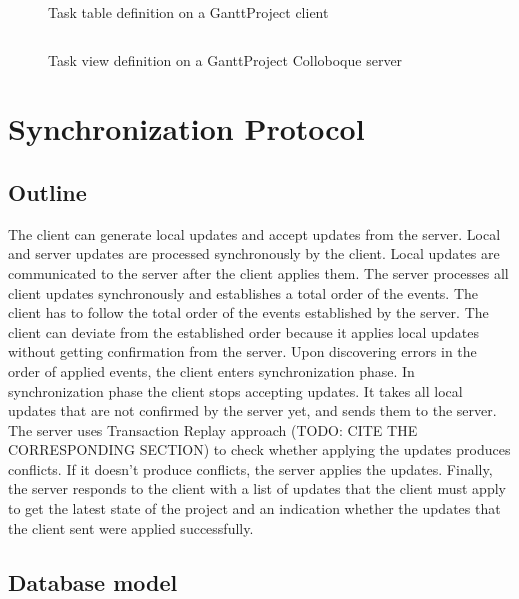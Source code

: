\documentclass[a4paper, 11pt, oneside]{article}
\theoremstyle{definition}
\begin{document}
\begin{figure}
    \inputminted[frame=single,linenos]{sql}{lst/client-database-init.sql}
    \caption{Task table definition on a GanttProject client}
    \label{fig:client-database-init}
\end{figure}

\begin{figure}
    \inputminted[frame=single,linenos,fontsize=\small]{sql}{lst/server-database-init.sql}
    \caption{Task view definition on a GanttProject Colloboque server}
    \label{fig:server-database-init}
\end{figure}

\section{Synchronization Protocol}\label{sec:protocol}

\subsection{Outline}

The client can generate local updates and accept updates from the server. Local and server updates are processed synchronously by the client. Local updates are communicated to the server after the client applies them. The server processes all client updates synchronously and establishes a total order of the events. The client has to follow the total order of the events established by the server. The client can deviate from the established order because it applies local updates without getting confirmation from the server. Upon discovering errors in the order of applied events, the client enters synchronization phase. In synchronization phase the client stops accepting updates. It takes all local updates that are not confirmed by the server yet, and sends them to the server. The server uses Transaction Replay approach (TODO: CITE THE CORRESPONDING SECTION) to check whether applying the updates produces conflicts. If it doesn't produce conflicts, the server applies the updates. Finally, the server responds to the client with a list of updates that the client must apply to get the latest state of the project and an indication whether the updates that the client sent were applied successfully.

\subsection{Database model}
\end{document}
